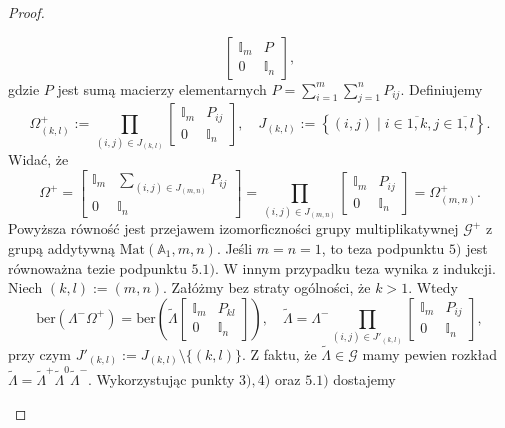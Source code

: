 \documentclass[11pt,a4paper]{report}
\theoremstyle{definition}
\newcommand{\ber}{\mathrm{ber}}
\newcommand{\I}{\mathbb{I}}
\begin{document}
\begin{proof}
\begin{enumerate}[1)]
\begin{enumerate}[5.1)]
$$\begin{bmatrix}
		      \I_m & P \\
		      0 & \I_n 
		\end{bmatrix}\!,$$
		gdzie $P$ jest sumą macierzy elementarnych $P = \sum_{i=1}^m \sum_{j=1}^n P_{ij}$. Definiujemy
		\begin{equation}
			\label{eq:prod_ber_pm}
			\Omega^+_{(k,l)} := \!\!\!\!\!\!\prod_{(i,j) \in J_{(k,l)}} \!\!\begin{bmatrix}
			\I_m & P_{ij} \\
			0 & \I_n 
			\end{bmatrix}\!\!, \quad J_{(k,l)} := \left\{ (i,j) \mid i \in \overline{1,k}, j \in \overline{1,l} \right\}\!.
		\end{equation}
		Widać, że 
		\begin{equation*}
			\Omega^+ = \begin{bmatrix}
			\I_m & \sum_{(i,j) \in J_{(m,n)}}P_{ij} \\
			0 & \I_n 
			\end{bmatrix} = \!\!\!\!\!\!\prod_{(i,j) \in J_{(m,n)}} \!\! \begin{bmatrix}
			\I_m & P_{ij} \\
			0 & \I_n 
			\end{bmatrix} = \Omega^+_{(m,n)}.
		\end{equation*}
		Powyższa równość jest przejawem izomorficzności grupy multiplikatywnej $\mathcal{G^+}$ z grupą addytywną $\mathrm{Mat}(\mathbb{A}_1,m,n)$. Jeśli $m=n=1$, to teza podpunktu $5)$ jest równoważna tezie podpunktu $5.1)$. W innym przypadku teza wynika z indukcji. Niech $(k,l):=(m,n)$. Załóżmy bez straty ogólności, że $k>1$. Wtedy
		\begin{equation*}
			\ber(\Lambda^-\Omega^+)= \ber \left(\tilde{\Lambda} \begin{bmatrix}
			\I_m & P_{kl} \\
			0 & \I_n 
			\end{bmatrix} \right),\quad \tilde{\Lambda} = \Lambda^- \!\!\!\!\!\!\prod_{(i,j) \in J'_{(k,l)}} \!\!\begin{bmatrix}
			\I_m & P_{ij} \\
			0 & \I_n 
			\end{bmatrix}\!\!,
		\end{equation*}
		przy czym $J'_{(k,l)} := J_{(k,l)} \setminus \{(k,l) \}$. Z faktu, że $\tilde{\Lambda} \in \mathcal{G}$ mamy pewien rozkład $\tilde{\Lambda} = \tilde{\Lambda}^+ \tilde{\Lambda}^0 \tilde{\Lambda}^-$. Wykorzystując punkty $3), 4)$ oraz $5.1)$ dostajemy
		\begin{equation*}

\end{equation*}
\end{enumerate}
\end{enumerate}
\end{proof}
\end{document}
